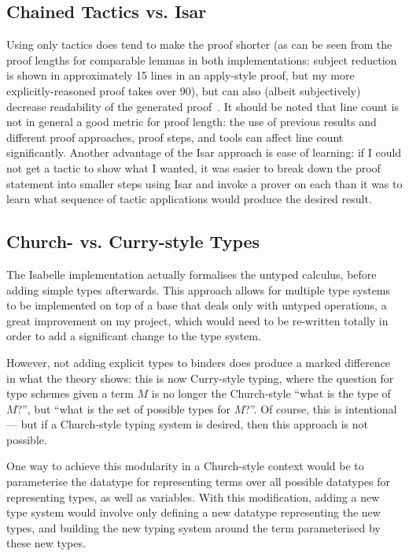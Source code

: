 \subsection{Chained Tactics vs. Isar}
Using only tactics does tend to make the proof shorter (as can be seen from the proof lengths for comparable lemmas in both implementations: subject reduction is shown in approximately 15 lines in an apply-style proof, but my more explicitly-reasoned proof takes over 90), but can also (albeit subjectively) decrease readability of the generated proof~\cite{isar-phd}.
It should be noted that line count is not in general a good metric for proof length: the use of previous results and different proof approaches, proof steps, and tools can affect line count significantly.
Another advantage of the Isar approach is ease of learning: if I could not get a tactic to show what I wanted, it was easier to break down the proof statement into smaller steps using Isar and invoke a prover on each than it was to learn what sequence of tactic applications would produce the desired result.

\subsection{Church- vs. Curry-style Types}
The Isabelle implementation actually formalises the untyped calculus, before adding simple types afterwards.
This approach allows for multiple type systems to be implemented on top of a base that deals only with untyped operations, a great improvement on my project, which would need to be re-written totally in order to add a significant change to the type system.

However, not adding explicit types to binders does produce a marked difference in what the theory shows: this is now Curry-style typing, where the question for type schemes given a term \(M\) is no longer the Church-style ``what is the type of \(M\)?'', but ``what is the set of possible types for \(M\)?''.
Of course, this is intentional --- but if a Church-style typing system is desired, then this approach is not possible.

One way to achieve this modularity in a Church-style context would be to parameterise the datatype for representing terms over all possible datatypes for representing types, as well as variables.
With this modification, adding a new type system would involve only defining a new datatype representing the new types, and building the new typing system around the term parameterised by these new types.

